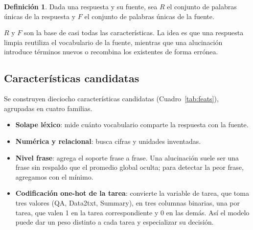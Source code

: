 \documentclass[12pt,a4paper]{report}
\theoremstyle{definition}
\newtheorem{definicion}{Definición}
\begin{document}
\begin{definicion}
Dada una respuesta y su fuente, sea $R$ el conjunto de palabras únicas de la respuesta y
$F$ el conjunto de palabras únicas de la fuente.
\end{definicion}

$R$ y $F$ son la base de casi todas las características. La idea es que una
respuesta limpia reutiliza el vocabulario de la fuente, mientras que una alucinación
introduce términos nuevos o recombina los existentes de forma errónea.

\subsection{Características candidatas}
\label{sec:catalogo}

Se construyen dieciocho características candidatas (Cuadro~\ref{tab:feats}), agrupadas en cuatro familias. 
\begin{itemize}
  \item \textbf{Solape léxico}: mide cuánto vocabulario comparte la respuesta con la fuente.
  \item \textbf{Numérica y relacional}: busca cifras y unidades inventadas.
  \item \textbf{Nivel frase}: agrega el soporte frase a frase. Una alucinación suele ser
        una frase sin respaldo que el promedio global oculta; para detectar la peor frase, agregamos con el
        mínimo.
  \item \textbf{Codificación one-hot de la tarea}: convierte la variable de tarea, que
        toma tres valores (QA, Data2txt, Summary), en tres columnas binarias, una por tarea,
        que valen 1 en la tarea correspondiente y 0 en las demás. Así el modelo puede dar un peso
        distinto a cada tarea y especializar su decisión.
\end{itemize}
\end{document}
